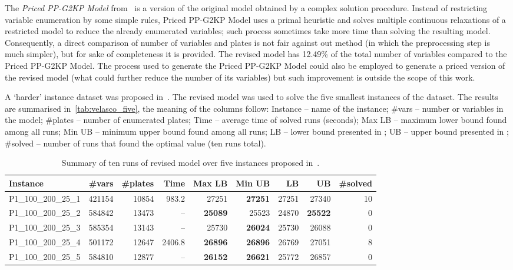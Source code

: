 \documentclass[runningheads]{llncs}
\begin{document}
The \emph{Priced PP-G2KP Model} from~\cite{furini:2016} is a version of the original model obtained by a complex solution procedure.
Instead of restricting variable enumeration by some simple rules, Priced PP-G2KP Model uses a primal heuristic and solves multiple continuous relaxations of a restricted model to reduce the already enumerated variables; such process sometimes take more time than solving the resulting model.
Consequently, a direct comparison of number of variables and plates is not fair against out method (in which the preprocessing step is much simpler), but for sake of completeness it is provided.
The revised model has 12.49\% of the total number of variables compared to the Priced PP-G2KP Model.
The process used to generate the Priced PP-G2KP Model could also be employed to generate a priced version of the revised model (what could further reduce the number of its variables) but such improvement is outside the scope of this work.

A `harder' instance dataset was proposed in~\cite{velasco}.
The revised model was used to solve the five smallest instances of the dataset.
The results are summarised in~\autoref{tab:velasco_five}, the meaning of the columns follow: Instance -- name of the instance; \#vars -- number or variables in the model; \#plates -- number of enumerated plates; Time -- average time of solved runs (seconds); Max LB -- maximum lower bound found among all runs; Min UB -- minimum upper bound found among all runs; \cite{velasco} LB -- lower bound presented in \cite{velasco}; \cite{velasco} UB -- upper bound presented in \cite{velasco}; \#solved -- number of runs that found the optimal value (ten runs total).

\begin{table}
\caption{Summary of ten runs of revised model over five instances proposed in~\cite{velasco}.}
\setlength\tabcolsep{2.5px}
\begin{tabular}{lrrrrrrrr}
Instance & \#vars & \#plates & Time & Max LB & Min UB & \cite{velasco} LB & \cite{velasco} UB & \#solved\\
\hline
P1\_100\_200\_25\_1 & 421154 & 10854 & 983.2 & 27251 & \textbf{27251} & 27251 & 27340 & 10 \\
P1\_100\_200\_25\_2 & 584842 & 13473 & -- & \textbf{25089} & 25523 & 24870 & \textbf{25522} & 0 \\
P1\_100\_200\_25\_3 & 585354 & 13143 & -- & 25730 & \textbf{26024} & 25730 & 26088 & 0 \\
P1\_100\_200\_25\_4 & 501172 & 12647 & 2406.8 & \textbf{26896} & \textbf{26896} & 26769 & 27051 & 8 \\
P1\_100\_200\_25\_5 & 584810 & 12877 & -- & \textbf{26152} & \textbf{26621} & 25772 & 26857 & 0 \\
\hline
\end{tabular}
\label{tab:velasco_five}
\end{table}
\end{document}
